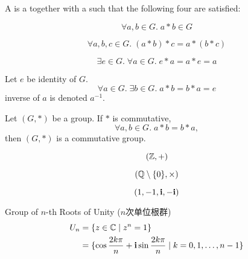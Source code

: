 
\begin{frame}
  \begin{definition}[Group (群)]
    A  is a 
    together with a 
    such that the following four  are satisfied:

    \pause
    \vspace{0.30cm}
    \begin{description}[<+->][Associativity:]
      \item[Closure (封闭):]
        \[
          \forall a, b \in G.\; a \ast b \in G
        \]
      \item[Associativity (结合律):]
        \[
          \forall a, b, c \in G.\; (a \ast b) \ast c = a \ast (b \ast c)
        \]
      \item[Identity (单位元):]
        \[
          \exists e \in G.\; \forall a \in G.\; e \ast a = a \ast e = a
        \]
      \item[Inverse (逆元):] Let $e$ be  identity of $G$.
        \[
          \forall a \in G.\; \exists b \in G.\; a \ast b = b \ast a = e
        \]
         inverse of $a$ is denoted $a^{-1}$.
    \end{description}
  \end{definition}
\end{frame}

\begin{frame}
  \begin{definition}
    Let $(G, \ast)$ be a group. If $\ast$ is commutative,
    \[
      \forall a, b \in G.\; a \ast b = b \ast a,
    \]
    then $(G, \ast)$ is a commutative group.
  \end{definition}
\end{frame}

\begin{frame}{}
    \[
      (\mathbb{Z}, +)
    \]

    \pause
    \[
      (\mathbb{Q} \setminus \{0\}, \times)
    \]

    \pause
    \[
      (1, -1, \text{\bf i}, -\text{\bf i})
    \]
\end{frame}

\begin{frame}
  \begin{exampleblock}{Group of $n$-th Roots of Unity ($n$次单位根群)}
    \begin{align*}
      U_{n} &= \{z \in \mathbb{C} \mid z^{n} = 1\} \\
            &= \{\cos \frac{2k\pi}{n} + \text{\bf i} \sin \frac{2k\pi}{n} \mid k = 0, 1, \dots, n-1\}
    \end{align*}
  \end{exampleblock}

  \pause
\end{frame}

